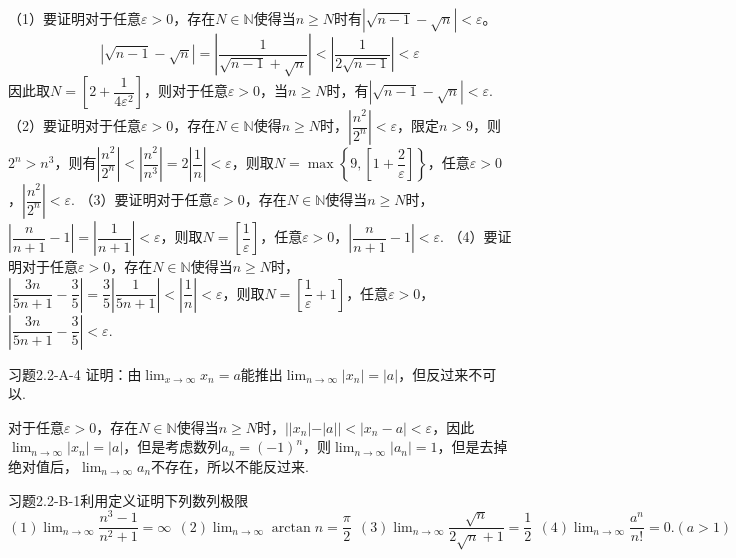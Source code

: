\begin{solution}
（1）要证明对于任意$\varepsilon>0$，存在$N\in\mathbb{N}$使得当$n\geq N$时有$|\sqrt{n-1}-\sqrt{n}|<\varepsilon$。
\[|\sqrt{n-1}-\sqrt{n}|=\left|\dfrac{1}{\sqrt{n-1}+\sqrt{n}}\right|<\left|\dfrac{1}{2\sqrt{n-1}}\right|<\varepsilon\]
因此取$N=\left[2+\dfrac{1}{4\varepsilon^2}\right]$，则对于任意$\varepsilon>0$，当$n\geq N$时，有$\left|\sqrt{n-1}-\sqrt{n}\right|<\varepsilon$.\newline
    （2）要证明对于任意$\varepsilon>0$，存在$N\in\mathbb{N}$使得$n\geq N$时，$\left|\dfrac{n^2}{2^n}\right|<\varepsilon$，限定$n>9$，则$2^n>n^3$，则有$\left|\dfrac{n^2}{2^n}\right|<\left|\dfrac{n^2}{n^3}\right|=2\left|\dfrac{1}{n}\right|<\varepsilon$，则取$N=\max\left\{9,\left[1+\dfrac{2}{\varepsilon}\right]\right\}$，任意$\varepsilon>0$，$\left|\dfrac{n^2}{2^n}\right|<\varepsilon$.\newline
    （3）要证明对于任意$\varepsilon>0$，存在$N\in\mathbb{N}$使得当$n\geq N$时，$\left|\dfrac{n}{n+1}-1\right|=\left|\dfrac{1}{n+1}\right|<\varepsilon$，则取$N=\left[\dfrac{1}{\varepsilon}\right]$，任意$\varepsilon>0$，$\left|\dfrac{n}{n+1}-1\right|<\varepsilon$.\newline
    （4）要证明对于任意$\varepsilon>0$，存在$N\in\mathbb{N}$使得当$n\geq N$时，$\left|\dfrac{3n}{5n+1}-\dfrac{3}{5}\right|=\dfrac{3}{5}\left|\dfrac{1}{5n+1}\right|<\left|\dfrac{1}{n}\right|<\varepsilon$，则取$N=\left[\dfrac{1}{\varepsilon}+1\right]$，任意$\varepsilon>0$，$\left|\dfrac{3n}{5n+1}-\dfrac{3}{5}\right|<\varepsilon$.\newline
\end{solution}
\begin{example}{习题2.2-A-4}{}
    证明：由$\displaystyle\lim_{x\to\infty}x_n=a$能推出$\displaystyle\lim_{n\to\infty}|x_n|=|a|$，但反过来不可以.
\end{example}
\begin{solution}
    对于任意$\varepsilon>0$，存在$N\in\mathbb{N}$使得当$n\geq N$时，$||x_n|-|a||<|x_n-a|<\varepsilon$，因此$\displaystyle\lim_{n\to\infty}|x_n|=|a|$，但是考虑数列$a_n=(-1)^n$，则$\displaystyle\lim_{n\to\infty}|a_n|=1$，但是去掉绝对值后，$\displaystyle\lim_{n\to\infty}a_n$不存在，所以不能反过来.
\end{solution}
\begin{example}{习题2.2-B-1}{利用定义证明下列数列极限}
$(1)\displaystyle \lim_{n\to\infty}\dfrac{n^3-1}{n^2+1}=\infty~~(2)\lim_{n\to\infty}\arctan n=\dfrac{\pi}2~~(3)\displaystyle \lim_{n\to\infty}\dfrac{\sqrt{n}}{2\sqrt{n}+1}=\dfrac12~~(4)\lim_{n\to\infty}\dfrac{a^n}{n!}=0.(a>1)$
\end{example}

